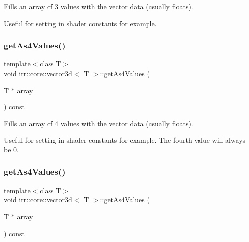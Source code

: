Fills an array of 3 values with the vector data (usually floats). 

Useful for setting in shader constants for example. \mbox{\label{classirr_1_1core_1_1vector3d_aa661941fdf725c83dc560b15232fdf6e}} 
\subsubsection{\texorpdfstring{get\+As4\+Values()}{getAs4Values()}\hspace{0.1cm}{\footnotesize\ttfamily [1/2]}}
{\footnotesize\ttfamily template$<$class T$>$ \\
void \hyperlink{classirr_1_1core_1_1vector3d}{irr\+::core\+::vector3d}$<$ T $>$\+::get\+As4\+Values (\begin{DoxyParamCaption}\item[{T $\ast$}]{array }\end{DoxyParamCaption}) const\hspace{0.3cm}{\ttfamily [inline]}}



Fills an array of 4 values with the vector data (usually floats). 

Useful for setting in shader constants for example. The fourth value will always be 0. \mbox{\label{classirr_1_1core_1_1vector3d_aa661941fdf725c83dc560b15232fdf6e}} 
\subsubsection{\texorpdfstring{get\+As4\+Values()}{getAs4Values()}\hspace{0.1cm}{\footnotesize\ttfamily [2/2]}}
{\footnotesize\ttfamily template$<$class T$>$ \\
void \hyperlink{classirr_1_1core_1_1vector3d}{irr\+::core\+::vector3d}$<$ T $>$\+::get\+As4\+Values (\begin{DoxyParamCaption}\item[{T $\ast$}]{array }\end{DoxyParamCaption}) const\hspace{0.3cm}{\ttfamily [inline]}}



